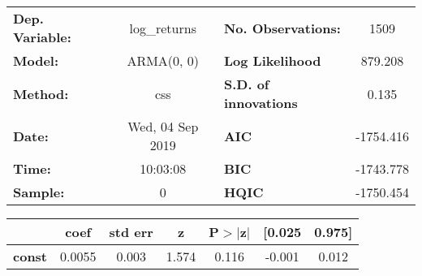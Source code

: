 \begin{center}
\begin{tabular}{lclc}
\toprule
\textbf{Dep. Variable:} &   log\_returns   & \textbf{  No. Observations:  } &    1509     \\
\textbf{Model:}         &    ARMA(0, 0)    & \textbf{  Log Likelihood     } &  879.208    \\
\textbf{Method:}        &       css        & \textbf{  S.D. of innovations} &   0.135     \\
\textbf{Date:}          & Wed, 04 Sep 2019 & \textbf{  AIC                } & -1754.416   \\
\textbf{Time:}          &     10:03:08     & \textbf{  BIC                } & -1743.778   \\
\textbf{Sample:}        &        0         & \textbf{  HQIC               } & -1750.454   \\
\bottomrule
\end{tabular}
\begin{tabular}{lcccccc}
               & \textbf{coef} & \textbf{std err} & \textbf{z} & \textbf{P$> |$z$|$} & \textbf{[0.025} & \textbf{0.975]}  \\
\midrule
\textbf{const} &       0.0055  &        0.003     &     1.574  &         0.116        &       -0.001    &        0.012     \\
\bottomrule
\end{tabular}
\end{center}
